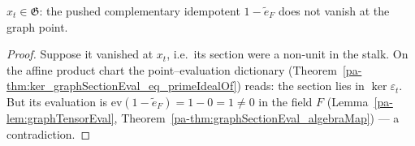 \begin{theorem}
  \label{pa-thm:graphPoint_mem_graphChart}
  \leanok

  \(x_t \in \mathfrak G\): the pushed complementary idempotent \(1 - \tilde e_F\) does not
  vanish at the graph point.
\end{theorem}
\begin{proof}
  \leanok
  Suppose it vanished at \(x_t\), i.e.\ its section were a non-unit in the stalk. On the
  affine product chart the point--evaluation dictionary
  (Theorem~\ref{pa-thm:ker_graphSectionEval_eq_primeIdealOf}) reads: the section lies in
  \(\ker\varepsilon_t\). But its evaluation is
  \(\mathrm{ev}(1 - \tilde e_F) = 1 - 0 = 1 \neq 0\) in the field \(F\)
  (Lemma~\ref{pa-lem:graphTensorEval}, Theorem~\ref{pa-thm:graphSectionEval_algebraMap}) — a
  contradiction.
\end{proof}

